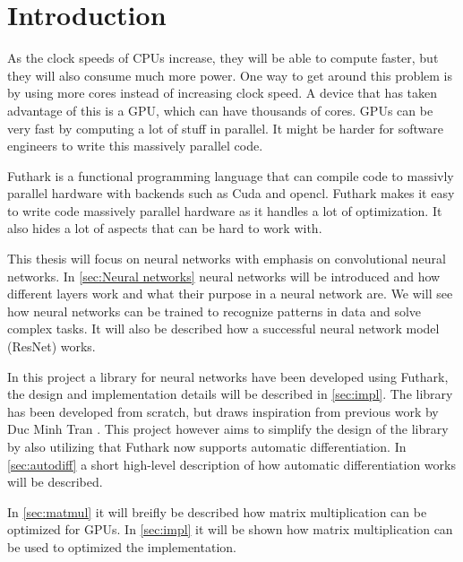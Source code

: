 \section{Introduction}
As the clock speeds of CPUs increase, they will be able to compute faster, but they will also consume much more power.
One way to get around this problem is by using more cores instead of increasing clock speed.
A device that has taken advantage of this is a GPU, which can have thousands of cores.
GPUs can be very fast by computing a lot of stuff in parallel.
It might be harder for software engineers to write this massively parallel code.

Futhark is a functional programming language that can compile code to massivly parallel hardware with backends such as Cuda and opencl.
Futhark makes it easy to write code massively parallel hardware as it handles a lot of optimization.
It also hides a lot of aspects that can be hard to work with.

This thesis will focus on neural networks with emphasis on convolutional neural networks.
In \autoref{sec:Neural networks} neural networks will be introduced and how different layers work and what their purpose in a neural network are.
We will see how neural networks can be trained to recognize patterns in data and solve complex tasks.
It will also be described how a successful neural network model (ResNet) works.

In this project a library for neural networks have been developed using Futhark, the design and implementation details will be described in \autoref{sec:impl}.
The library has been developed from scratch, but draws inspiration from previous work by Duc Minh Tran \cite{duc}.
This project however aims to simplify the design of the library by also utilizing that Futhark now supports automatic differentiation.
In \autoref{sec:autodiff} a short high-level description of how automatic differentiation works will be described.

In \autoref{sec:matmul} it will breifly be described how matrix multiplication can be optimized for GPUs.
In \autoref{sec:impl} it will be shown how matrix multiplication can be used to optimized the implementation.

